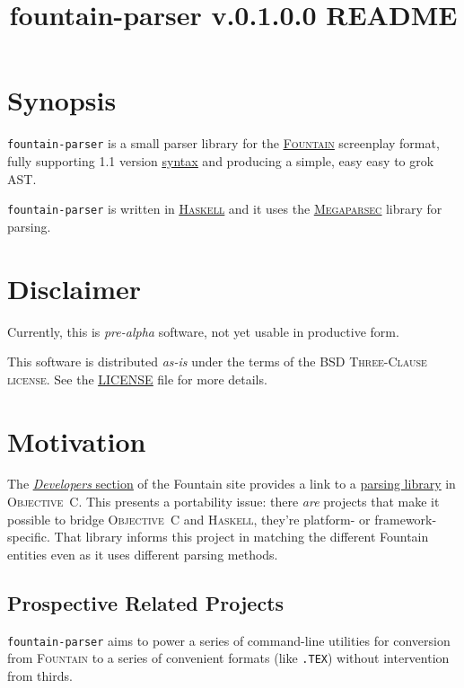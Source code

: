 \documentclass[11pt]{article}
\newcommand{\link}[2]{\underline{\color{darkblue}\href{#1}{#2}}}
\begin{document}
\title{fountain-parser v.0.1.0.0 README}
\author{}
\date{}
\maketitle

\section*{Synopsis} \texttt{fountain-parser} is a small parser library
for the \link{https://fountain.io/}{\textsc{Fountain}} screenplay
format, fully supporting 1.1 version
\link{https://fountain.io/syntax/}{syntax} and producing a simple, easy
easy to grok \textsc{AST}.

\texttt{fountain-parser} is written in
\link{https://haskell.org}{\textsc{Haskell}} and it uses the
\link{https://hackage.haskell.org/package/megaparsec}{\textsc{Megaparsec}}
library for parsing.

\section*{Disclaimer}
Currently, this is \emph{pre-alpha} software, not yet usable in
productive form.

This software is distributed \emph{as-is} under the terms of the
\textsc{BSD Three-Clause license}.  See the
\link{run:./LICENSE}{LICENSE} file for more details.

\section*{Motivation} The
\link{https://fountain.io/developers/}{\emph{Developers} section} of the
Fountain site provides a link to a
\link{https://github.com/nyousefi/Fountain}{parsing library} in
\textsc{Objective~C}. This presents a portability issue: there
\emph{are} projects that make it possible to bridge \textsc{Objective~C}
and \textsc{Haskell}, they’re platform- or framework-specific.  That
library informs this project in matching the different Fountain entities
even as it uses different parsing methods.

\subsection*{Prospective Related Projects}
\texttt{fountain-parser} aims to power a series of command-line
utilities for conversion from \textsc{Fountain} to a series of
convenient formats (like \texttt{.TEX}) without intervention
from thirds.
\end{document}
